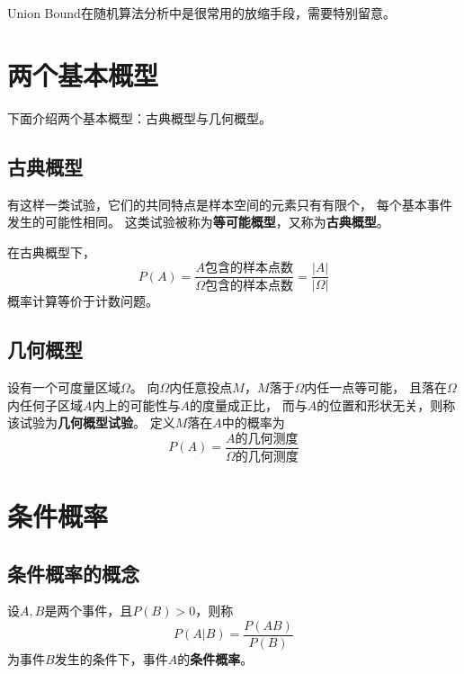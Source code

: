 \begin{remark}
  Union Bound在随机算法分析中是很常用的放缩手段，需要特别留意。
\end{remark}

\section{两个基本概型}
下面介绍两个基本概型：古典概型与几何概型。

\subsection{古典概型}
有这样一类试验，它们的共同特点是样本空间的元素只有有限个，
每个基本事件发生的可能性相同。
这类试验被称为\textbf{等可能概型}，又称为\textbf{古典概型}。

在古典概型下，
\begin{displaymath}
  P(A)=\frac{\text{$A$包含的样本点数}}{\text{$\Omega$包含的样本点数}}
  =\frac{|A|}{|\Omega|}
\end{displaymath}
概率计算等价于计数问题。

\subsection{几何概型}
设有一个可度量区域$\Omega$。
向$\Omega$内任意投点$M$，$M$落于$\Omega$内任一点等可能，
且落在$\Omega$内任何子区域$A$内上的可能性与$A$的度量成正比，
而与$A$的位置和形状无关，则称该试验为\textbf{几何概型试验}。
定义$M$落在$A$中的概率为
\begin{displaymath}
  P(A) = \frac{\text{$A$的几何测度}}{\text{$\Omega$的几何测度}}
\end{displaymath}

\section{条件概率}

\subsection{条件概率的概念}
\begin{definition}[条件概率]
  设$A,B$是两个事件，且$P(B)>0$，则称
  \begin{displaymath}
    P(A|B) = \frac{P(AB)}{P(B)}
  \end{displaymath}
  为事件$B$发生的条件下，事件$A$的\textbf{条件概率}。
\end{definition}


